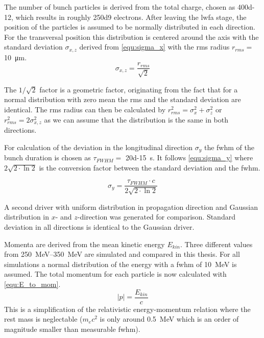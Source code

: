 \documentclass[bachelor_thesis]{subfiles}
\begin{document}
The number of bunch particles is derived from the total charge, chosen as \qty{400d-12}{\C}, which results in roughly \num{250d9} electrons. After leaving the \gls{lwfa} stage, the position of the particles is assumed to be normally distributed in each direction.
For the transversal position this distribution is centered around the axis with the standard deviation $\sigma_{x,z}$ derived from \autoref{equ:sigma_x} with the \gls{rms} radius $r_{rms}=$ \qty{10}{\um}.
\begin{equation}
	\sigma_{x,z}=\frac{r_{rms}}{\sqrt{2}} 
	\label{equ:sigma_x}
\end{equation}

The $1/\sqrt{2}$ factor is a geometric factor, originating from the fact that for a normal distribution with zero mean the \gls{rms} and the standard deviation are identical. 
The \gls{rms} radius can then be calculated by $r_{rms}^2=\sigma_{x}^2 + \sigma_{z}^2$ or $r_{rms}^2=2\sigma_{x,z}^2$ as we can assume that the distribution is the same in both directions.

For calculation of the deviation in the longitudinal direction $\sigma_y$ the \gls{fwhm} of the bunch duration is chosen as $\tau_{FWHM}=$ \qty{20d-15}{\s}. 
It follows \autoref{equ:sigma_y} where $2\sqrt{2\cdot\ln{2}}$ is the conversion factor between the standard deviation and the \gls{fwhm}.

\begin{equation}
	\sigma_{y}=\frac{\tau_{FWHM}\cdot c}{2\sqrt{2\cdot\ln{2}}}
	\label{equ:sigma_y}
\end{equation}

A second driver with uniform distribution in propagation direction and Gaussian distribution in $x$- and $z$-direction was generated for comparison. Standard deviation in all directions is identical to the Gaussian driver.

Momenta are derived from the mean kinetic energy $E_{kin}$. Three different values from \qtyrange{250}{350}{\MeV} are simulated and compared in this thesis.
For all simulations a normal distribution of the energy with a \gls{fwhm} of \qty{10}{\MeV} is assumed. The total momentum for each particle is now calculated with \autoref{equ:E_to_mom}.
\begin{equation}
	\left|p\right|=\frac{E_{kin}}{c}
	\label{equ:E_to_mom}
\end{equation}
This is a simplification of the relativistic energy-momentum relation where the rest mass is neglectable ($m_{e}c^2$ is only around \qty{0.5}{\MeV} which is an order of magnitude smaller than measurable \gls{fwhm}).
\end{document}
